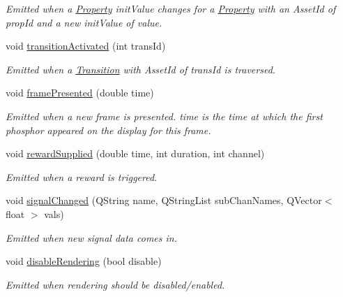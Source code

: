 \begin{DoxyCompactItemize}
\begin{DoxyCompactList}\small\item\em Emitted when a \hyperlink{class_picto_1_1_property}{Property} init\-Value changes for a \hyperlink{class_picto_1_1_property}{Property} with an Asset\-Id of prop\-Id and a new init\-Value of value. \end{DoxyCompactList}\item 
\hypertarget{class_picto_1_1_state_updater_a0d2330aed87fb71711f4eb722c2b6b98}{void \hyperlink{class_picto_1_1_state_updater_a0d2330aed87fb71711f4eb722c2b6b98}{transition\-Activated} (int trans\-Id)}\label{class_picto_1_1_state_updater_a0d2330aed87fb71711f4eb722c2b6b98}

\begin{DoxyCompactList}\small\item\em Emitted when a \hyperlink{class_picto_1_1_transition}{Transition} with Asset\-Id of trans\-Id is traversed. \end{DoxyCompactList}\item 
\hypertarget{class_picto_1_1_state_updater_adc9841e4bb187c02f6cb81cad576f506}{void \hyperlink{class_picto_1_1_state_updater_adc9841e4bb187c02f6cb81cad576f506}{frame\-Presented} (double time)}\label{class_picto_1_1_state_updater_adc9841e4bb187c02f6cb81cad576f506}

\begin{DoxyCompactList}\small\item\em Emitted when a new frame is presented. time is the time at which the first phosphor appeared on the display for this frame. \end{DoxyCompactList}\item 
void \hyperlink{class_picto_1_1_state_updater_ad5ee865d12ecc835be806d4ed8146607}{reward\-Supplied} (double time, int duration, int channel)
\begin{DoxyCompactList}\small\item\em Emitted when a reward is triggered. \end{DoxyCompactList}\item 
void \hyperlink{class_picto_1_1_state_updater_affd32e4d69b3b1d2b21c35f1f0159fb0}{signal\-Changed} (Q\-String name, Q\-String\-List sub\-Chan\-Names, Q\-Vector$<$ float $>$ vals)
\begin{DoxyCompactList}\small\item\em Emitted when new signal data comes in. \end{DoxyCompactList}\item 
void \hyperlink{class_picto_1_1_state_updater_a6e1134167de2d8d6846f326b8b318bf8}{disable\-Rendering} (bool disable)
\begin{DoxyCompactList}\small\item\em Emitted when rendering should be disabled/enabled. \end{DoxyCompactList}\end{DoxyCompactItemize}
